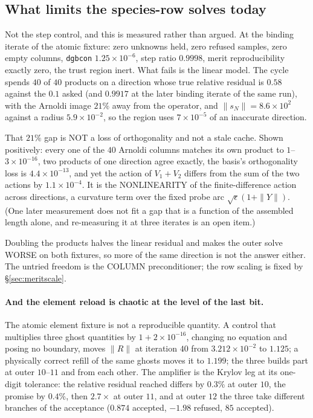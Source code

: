 \documentclass[english,a4paper]{my_memo}
\newcommand{\code}[1]{\texttt{#1}}
\begin{document}
\subsection{What limits the species-row solves today}
\label{sec:limit}

Not the step control, and this is measured rather than argued. At the
binding iterate of the atomic fixture: zero unknowns held, zero refused
samples, zero empty columns, \code{dgbcon} $1.25\times10^{-6}$, step ratio
$0.9998$, merit reproducibility exactly zero, the trust region inert. What
fails is the linear model. The cycle spends $40$ of $40$ products on a
direction whose true relative residual is $0.58$ against the $0.1$ asked
(and $0.9917$ at the later binding iterate of the same run), with the Arnoldi
image $21\%$ away from the operator, and $\|s_N\| = 8.6\times10^{2}$ against a
radius $5.9\times10^{-2}$, so the region uses $7\times10^{-5}$ of an
inaccurate direction.

That $21\%$ gap is NOT a loss of orthogonality and not a stale cache. Shown
positively: every one of the $40$ Arnoldi columns matches its own product to
$1$--$3\times10^{-16}$, two products of one direction agree exactly, the
basis's orthogonality loss is $4.4\times10^{-13}$, and yet the action of
$V_1 + V_2$ differs from the sum of the two actions by $1.1\times10^{-4}$. It
is the NONLINEARITY of the finite-difference action across directions, a
curvature term over the fixed probe arc $\sqrt{\epsilon}(1 + \|Y\|)$. (One
later measurement does not fit a gap that is a function of the assembled
length alone, and re-measuring it at three iterates is an open item.)

Doubling the products halves the linear residual and makes the outer solve
WORSE on both fixtures, so more of the same direction is not the answer
either. The untried freedom is the COLUMN preconditioner; the row scaling is
fixed by \S\ref{sec:meritscale}.

\paragraph{And the element reload is chaotic at the level of the last bit.} The atomic
element fixture is not a reproducible quantity. A control that multiplies
three ghost quantities by $1 + 2\times10^{-16}$, changing no equation and
posing no boundary, moves $\|R\|$ at iteration $40$ from
$3.212\times10^{-2}$ to $1.125$; a physically correct refill of the same
ghosts moves it to $1.199$; the three builds part at outer $10$--$11$ and from
each other. The amplifier is the Krylov leg at its one-digit tolerance: the
relative residual reached differs by $0.3\%$ at outer $10$, the promise by
$0.4\%$, then $2.7\times$ at outer $11$, and at outer $12$ the three take
different branches of the acceptance ($0.874$ accepted, $-1.98$ refused,
$85$ accepted).
\end{document}
